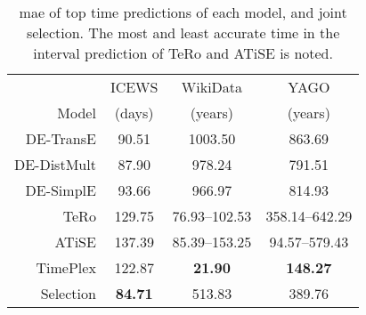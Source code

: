 \begin{table}[htb]
\centering
\begin{minipage}{\columnwidthcaption}
\centering
\caption{\gls{mae} of top time predictions of each model, and joint selection. The most and least accurate time in the interval prediction of TeRo and ATiSE is noted.
}
\vspace{-3mm}

\begin{tabular}{r|ccc}\hline
 & ICEWS & WikiData & YAGO \\
Model & (days) & (years) & (years) \\ \hline
DE-TransE & 90.51 & 1003.50 & 863.69 \\ 
DE-DistMult & 87.90 & 978.24 & 791.51 \\ 
DE-SimplE & 93.66 & 966.97 & 814.93 \\ 
TeRo & 129.75 & 76.93–102.53 & 358.14–642.29 \\
ATiSE & 137.39 & 85.39–153.25 & 94.57–579.43 \\ 
TimePlex & 122.87 & \textbf{21.90} & \textbf{148.27}\\
\hline
Selection & \textbf{84.71} & 513.83 & 389.76 \\ \hline 

\end{tabular}

\label{tab:timestamp_voting_table}
\end{minipage}
\end{table}

